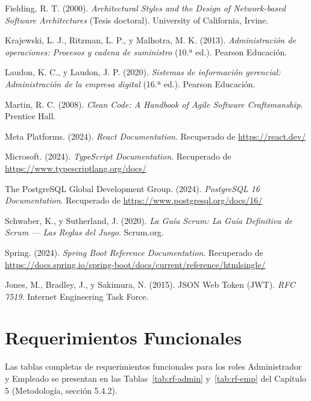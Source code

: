 \documentclass[12pt, letterpaper]{report}
\begin{document}
\begin{enumerate}[label={[\arabic*]}]
    \item Fielding, R. T. (2000). \textit{Architectural Styles and the Design of Network-based Software Architectures} (Tesis doctoral). University of California, Irvine.
    \item Krajewski, L. J., Ritzman, L. P., y Malhotra, M. K. (2013). \textit{Administración de operaciones: Procesos y cadena de suministro} (10.ª ed.). Pearson Educación.
    \item Laudon, K. C., y Laudon, J. P. (2020). \textit{Sistemas de información gerencial: Administración de la empresa digital} (16.ª ed.). Pearson Educación.
    \item Martin, R. C. (2008). \textit{Clean Code: A Handbook of Agile Software Craftsmanship}. Prentice Hall.
    \item Meta Platforms. (2024). \textit{React Documentation}. Recuperado de \url{https://react.dev/}
    \item Microsoft. (2024). \textit{TypeScript Documentation}. Recuperado de \url{https://www.typescriptlang.org/docs/}
    \item The PostgreSQL Global Development Group. (2024). \textit{PostgreSQL 16 Documentation}. Recuperado de \url{https://www.postgresql.org/docs/16/}
    \item Schwaber, K., y Sutherland, J. (2020). \textit{La Guía Scrum: La Guía Definitiva de Scrum --- Las Reglas del Juego}. Scrum.org.
    \item Spring. (2024). \textit{Spring Boot Reference Documentation}. Recuperado de \url{https://docs.spring.io/spring-boot/docs/current/reference/htmlsingle/}
    \item Jones, M., Bradley, J., y Sakimura, N. (2015). JSON Web Token (JWT). \textit{RFC 7519}. Internet Engineering Task Force.
\end{enumerate}


\appendix

\chapter{Requerimientos Funcionales}

Las tablas completas de requerimientos funcionales para los roles Administrador y Empleado se presentan en las Tablas~\ref{tab:rf-admin} y~\ref{tab:rf-emp} del Capítulo 5 (Metodología, sección 5.4.2).
\end{document}
